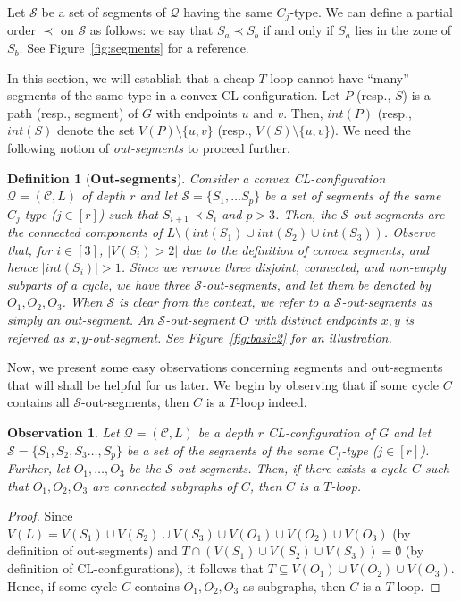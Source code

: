\documentclass{article}
\newtheorem{observation}[theorem]{Observation}
\newtheorem{definition}[theorem]{Definition}
\numberwithin{claimcounter}{lemma}
\begin{document}
Let $\mathcal{S}$ be a set of segments of $\mathcal{Q}$ having the same $C_j$-type. We can define a partial order $\prec$ on $\mathcal{S}$ as follows: we say that $S_a \prec S_b $ if and only if $S_a$ lies in the zone of $S_b$. See Figure~\ref{fig:segments} for a reference. 




In this section, we will establish that a cheap $T$-loop cannot have ``many'' segments of the same type in a convex CL-configuration. Let $P$ (resp., $S$) is a path (resp., segment) of $G$ with endpoints $u$ and $v$. Then, $int(P)$ (resp., $int(S)$ denote the set $V(P)\setminus\{u,v\}$ (resp., $V(S)\setminus \{u,v\}$). We need the following notion of \textit{out-segments} to proceed further.

 



\begin{definition}[{\bf Out-segments}]\label{D:OS}
    Consider a convex CL-configuration $\mathcal{Q}=(\mathcal{C},L)$ of depth $r$ and let $\mathcal{S} = \{S_1,\ldots S_p\}$ be a set of segments of the same $C_j$-type ($j\in [r]$) such that $S_{i+1} \prec S_i$ and $p >3$.  Then, the $\mathcal{S}$-out-segments are the connected components of $L\setminus(int(S_1)\cup int(S_2) \cup int(S_3))$. Observe that, for $i\in [3]$, $|V(S_i)>2|$ due to the definition of convex segments, and hence $|int(S_i)|>1$. Since we remove three disjoint, connected, and non-empty subparts of a cycle, we have three $\mathcal{S}$-out-segments, and let them be denoted by $O_1,O_2,O_3$. When $\mathcal{S}$ is clear from the context, we refer to a $\mathcal{S}$-out-segments as simply an out-segment. An $\mathcal{S}$-out-segment $O$ with distinct endpoints $x,y$ is referred as $x,y$-out-segment. See Figure~\ref{fig:basic2} for an illustration. 
\end{definition}





Now, we present some easy observations concerning segments and out-segments that will shall be helpful for us later. We begin by observing that if some cycle $C$ contains all $\mathcal{S}$-out-segments, then $C$ is a $T$-loop indeed.
\begin{observation}\label{O:three}
    Let $\mathcal{Q}=(\mathcal{C},L)$ be a depth $r$ CL-configuration of $G$ and let $\mathcal{S} = \{S_1,S_2,S_3\ldots,S_p\}$ be a set of the segments of the same $C_j$-type ($j\in [r]$). Further, let   $O_1,\ldots,O_3$ be the $\mathcal{S}$-out-segments. Then, if there exists a cycle $C$ such that $O_1,O_2,O_3$ are connected subgraphs of $C$, then $C$ is a $T$-loop.
\end{observation}
\begin{proof}
    Since $V(L) = V(S_1)\cup V(S_2) \cup V(S_3)\cup V(O_1) \cup V(O_2) \cup V(O_3)$ (by definition of out-segments) and $T\cap (V(S_1)\cup V(S_2) \cup V(S_3)) = \emptyset$ (by definition of CL-configurations), it follows that $T\subseteq V(O_1) \cup V(O_2) \cup V(O_3)$. Hence, if some cycle $C$ contains $O_1,O_2,O_3$ as subgraphs, then $C$ is a $T$-loop.
\end{proof}
\end{document}
